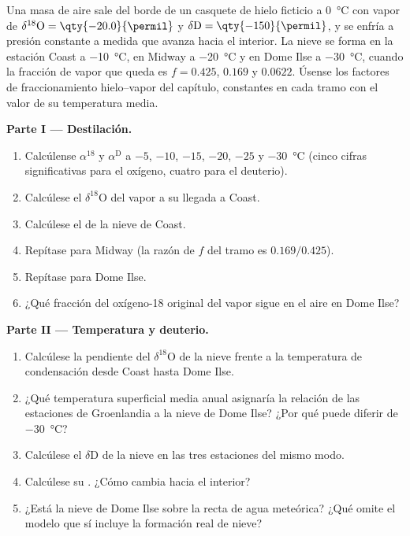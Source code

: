 \begin{problem}\label{pb:b3:stable-isotopes:1}
Una masa de aire sale del borde de un casquete de hielo ficticio a \qty{0}{\celsius}
con vapor de $\delta^{18}\mathrm O = \qty{-20.0}{\permil}$ y $\delta\mathrm D =
\qty{-150}{\permil}$, y se enfría a presión constante a medida que avanza hacia el interior.
La nieve se forma en la estación Coast a \qty{-10}{\celsius}, en Midway a
\qty{-20}{\celsius} y en Dome Ilse a \qty{-30}{\celsius}, cuando la fracción
de vapor que queda es $f = 0.425$, $0.169$ y $0.0622$. Úsense los factores de fraccionamiento
hielo--vapor del capítulo, constantes en cada tramo con el valor de
su temperatura media.

\medskip\noindent\textbf{Parte I --- Destilación.}
\begin{enumerate}
\item Calcúlense $\alpha^{18}$ y $\alpha^{\mathrm D}$ a $-5$, $-10$, $-15$, $-20$,
$-25$ y \qty{-30}{\celsius} (cinco cifras significativas para el oxígeno, cuatro para
el deuterio).
\item Calcúlese el $\delta^{18}\mathrm O$ del vapor a su llegada a Coast.
\item Calcúlese el de la nieve de Coast.
\item Repítase para Midway (la razón de $f$ del tramo es $0.169/0.425$).
\item Repítase para Dome Ilse.
\item ¿Qué fracción del oxígeno-18 original del vapor sigue en el aire
en Dome Ilse?
\end{enumerate}

\medskip\noindent\textbf{Parte II --- Temperatura y deuterio.}
\begin{enumerate}[resume]
\item Calcúlese la pendiente del $\delta^{18}\mathrm O$ de la nieve frente a la
temperatura de condensación desde Coast hasta Dome Ilse.
\item ¿Qué temperatura superficial media anual asignaría la relación de las estaciones
de Groenlandia a la nieve de Dome Ilse? ¿Por qué puede diferir de
\qty{-30}{\celsius}?
\item Calcúlese el $\delta\mathrm D$ de la nieve en las tres estaciones del mismo modo.
\item Calcúlese su . ¿Cómo cambia hacia el interior?
\item ¿Está la nieve de Dome Ilse sobre la recta de agua meteórica? ¿Qué omite
el modelo que sí incluye la formación real de nieve?
\end{enumerate}


\end{problem}
